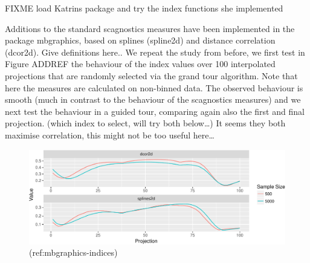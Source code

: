 \documentclass[article]{jss}
\begin{document}
FIXME load Katrins package and try the index functions she implemented

Additions to the standard scagnostics measures have been implemented in
the package mbgraphics, based on splines (spline2d) and distance
correlation (dcor2d). Give definitions here.. We repeat the study from
before, we first test in Figure ADDREF the behaviour of the index values
over 100 interpolated projections that are randomly selected via the
grand tour algorithm. Note that here the measures are calculated on
non-binned data. The observed behaviour is smooth (much in contrast to
the behaviour of the scagnostics measures) and we next test the
behaviour in a guided tour, comparing again also the first and final
projection. (which index to select, will try both below\ldots{}) It
seems they both maximise correlation, this might not be too useful
here\ldots{}

\begin{CodeChunk}
\begin{figure}

{\centering \includegraphics[width=\textwidth]{figure/mbgraphics-indices-1} 

}

\caption[(ref:mbgraphics-indices)]{(ref:mbgraphics-indices)}\label{fig:mbgraphics-indices}
\end{figure}
\end{CodeChunk}
\end{document}
